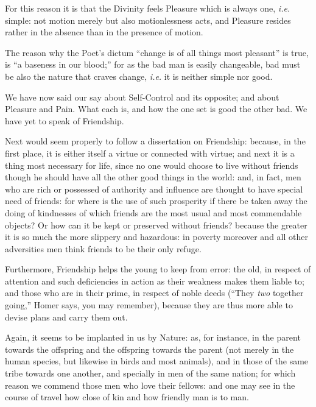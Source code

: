 For this reason it is that the Divinity feels Pleasure which is always one,
\emph{i.e.} simple: not motion merely but also motionlessness acts, and
Pleasure resides rather in the absence than in the presence of motion.

The reason why the Poet’s dictum “change is of all things most
pleasant” is true, is “a baseness in our blood;” for as the
bad man is easily changeable, bad must be also the nature that craves change,
\emph{i.e.} it is neither simple nor good.

We have now said our say about Self-Control and its opposite; and about
Pleasure and Pain. What each is, and how the one set is good the other bad. We
have yet to speak of Friendship.



Next would seem properly to follow a dissertation on Friendship: because, in
the first place, it is either itself a virtue or connected with virtue; and
next it is a thing most necessary for life, since no one would choose to live
without friends though he should have all the other good things in the world:
and, in fact, men who are rich or possessed of authority and influence are
thought to have special need of friends: for where is the use of such
prosperity if there be taken away the doing of kindnesses of which friends are
the most usual and most commendable objects? Or how can it be kept or preserved
without friends? because the greater it is so much the more slippery and
hazardous: in poverty moreover and all other adversities men think friends to
be their only refuge.

Furthermore, Friendship helps the young to keep from error: the old, in respect
of attention and such deficiencies in action as their weakness makes them
liable to; and those who are in their prime, in respect of noble deeds
(“They \emph{two} together going,” Homer says, you may remember),
because they are thus more able to devise plans and carry them out.

Again, it seems to be implanted in us by Nature: as, for instance, in the
parent towards the offspring and the offspring towards the parent (not merely
in the human species, but likewise in birds and most animals), and in those of
the same tribe towards one another, and specially in men of the same nation;
for which reason we commend those men who love their fellows: and one may see
in the course of travel how close of kin and how friendly man is to man.

